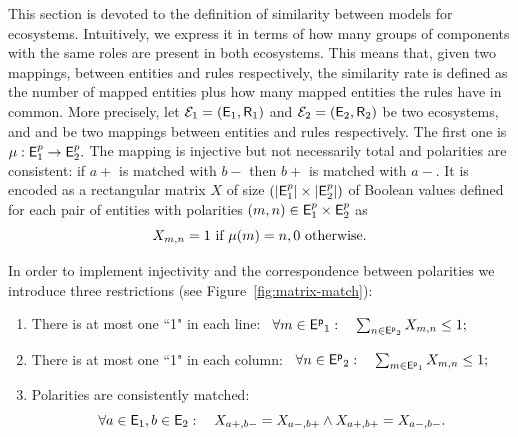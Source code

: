 \documentclass[a4paper,twoside]{article}
\begin{document}
This section is devoted to the definition of similarity between models for ecosystems. 
Intuitively, we express it in terms of how many  groups of components with the same roles are present in both ecosystems.
This means that, given two mappings, between entities and rules respectively, 
the similarity rate is defined as the number of mapped entities plus how many mapped entities the rules have in common. 
More precisely, let $\mathcal{E}_1 = (\mathsf{E}_1, \mathsf{R}_1)$ and $\mathcal{E}_2 =
(\mathsf{E}_2, \mathsf{R}_2)$ be two ecosystems, and \mapcomp and \maprule be two mappings between entities and rules respectively.
The first one is $\mu : \mathsf{E}^p_1 \to \mathsf{E}^p_2.$
The mapping \mapcomp is injective but not necessarily total and polarities are consistent: \ie if $a+$ is matched with $b-$ then $b+$ is matched with $a-$. It is encoded as a rectangular matrix $X$  of size $(|\mathsf{E}^p_1| \times |\mathsf{E}^p_2|)$ of Boolean values defined for each pair of entities with polarities $(m,n) \in \mathsf{E}^p_1 \times \mathsf{E}^p_2$ as
$$X_{m,n} = 1 \text{ if } \mu(m)=n, 0 \text{ otherwise.} $$

In order to implement  injectivity and the correspondence between polarities we introduce three restrictions (see Figure~\ref{fig:matrix-match}): 
\begin{enumerate}
\item There is at most one ``1" in  each line:~ 
$
\forall m \in \mathsf{E^p}_1: \quad
   \sum_{n \in \mathsf{E^p}_2} X_{m,n}  \leq 1;
  $
  
 \item There is at most one ``1" in  each column:~  
$
\forall n \in \mathsf{E^p}_2: \quad
   \sum_{m \in \mathsf{E^p}_1} X_{m,n}  \leq 1;
  $
 \item Polarities are consistently matched: 
$$
 \forall a \in \mathsf{E}_1, b \in \mathsf{E}_2: 
   \quad X_{a+,b-} = X_{a-,b+} \land X_{a+,b+} = X_{a-,b-} .
$$
\end{enumerate}
\end{document}
